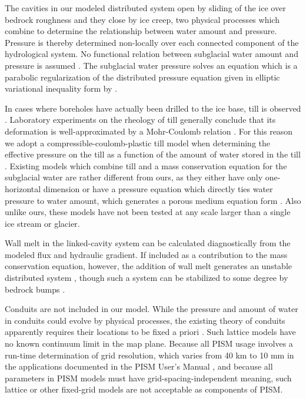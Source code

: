 \documentclass[gmd]{copernicus}   %
\begin{document}
The cavities in our modeled distributed system open by sliding of the ice over bedrock roughness and they close by ice creep, two physical processes which combine to determine the relationship between water amount and pressure.  Pressure is thereby determined non-locally over each connected component of the hydrological system.  No functional relation between subglacial water amount and pressure is assumed \citep[compare][]{FlowersClarke2002_theory}.  The subglacial water pressure solves an equation which is a parabolic regularization of the distributed pressure equation given in elliptic variational inequality form by \cite{Schoofetal2012}.

In cases where boreholes have actually been drilled to the ice base, till is observed \citep{Hookeetal1997,Tulaczyketal2000,TrufferHarrisonEchelmeyer2000,TrufferHarrison2006}.  Laboratory experiments on the rheology of till \citep{Hookeetal1997,Tulaczyketal2000,TrufferEchelmeyerHarrison2001} generally conclude that its deformation is well-approximated by a Mohr-Coulomb relation \citep{SchoofTill}.  For this reason we adopt a compressible-coulomb-plastic till model when determining the effective pressure on the till as a function of the amount of water stored in the till \citep{Tulaczyketal2000}.  Existing models which combine till and a mass conservation equation for the subglacial water are rather different from ours, as they either have only one-horizontal dimension \citep{vanderWeletal2013} or have a pressure equation which directly ties water pressure to water amount, which generates a porous medium equation form \citep{FlowersClarke2002_theory,deFleurianetal2014}.  Also unlike ours, these models have not been tested at any scale larger than a single ice stream or glacier.

Wall melt in the linked-cavity system can be calculated diagnostically from the modeled flux and hydraulic gradient.  If included as a contribution to the mass conservation equation, however, the addition of wall melt generates an unstable distributed system \citep{Walder1982}, though such a system can be stabilized to some degree by bedrock bumps \citep{CreytsSchoof2009}.

Conduits are not included in our model.  While the pressure and amount of water in conduits could evolve by physical processes, the existing theory of conduits apparently requires their locations to be fixed a priori \citep{Schoofmeltsupply,PimentelFlowers2011,Hewittetal2012,Hewitt2013,Werderetal2013}.  Such lattice models have no known continuum limit in the map plane.  Because all PISM usage involves a run-time determination of grid resolution, which varies from 40 km to 10 mm in the applications documented in the PISM User's Manual \citep{pism-user-manual}, and because all parameters in PISM models must have grid-spacing-independent meaning, such lattice or other fixed-grid models are not acceptable as components of PISM.
\end{document}
